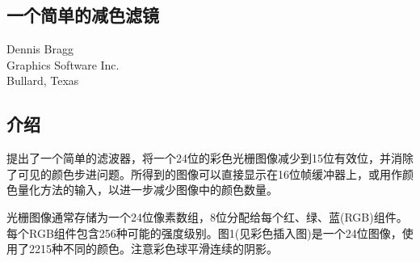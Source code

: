 \begin{CJK}{UTF8}{gbsn}
\newpage
\section{一个简单的减色滤镜}
\begin{center}
\small{
Dennis Bragg\\
Graphics Software Inc.\\
Bullard, Texas}
\end{center}
\subsection{介绍}
提出了一个简单的滤波器，将一个24位的彩色光栅图像减少到15位有效位，并消除了可见的颜色步进问题。所得到的图像可以直接显示在16位帧缓冲器上，或用作颜色量化方法的输入，以进一步减少图像中的颜色数量。

光栅图像通常存储为一个24位像素数组，8位分配给每个红、绿、蓝(RGB)组件。每个RGB组件包含256种可能的强度级别。图1(见彩色插入图)是一个24位图像，使用了2215种不同的颜色。注意彩色球平滑连续的阴影。

\end{CJK}
